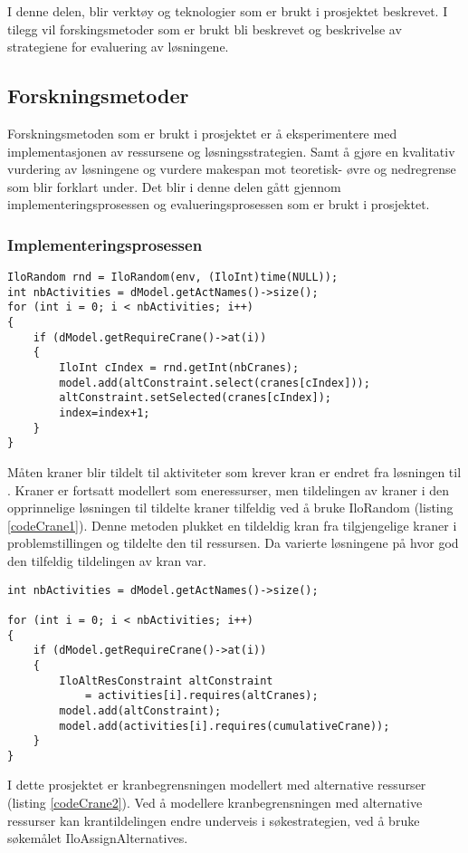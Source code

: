 I denne delen, blir verktøy og teknologier som er brukt i prosjektet beskrevet. I tilegg vil forskingsmetoder som er brukt bli beskrevet og beskrivelse av strategiene for evaluering av løsningene.

\subsection{Forskningsmetoder}
Forskningsmetoden som er brukt i prosjektet er å eksperimentere med implementasjonen av ressursene og løsningsstrategien. Samt å gjøre en kvalitativ vurdering av løsningene og vurdere makespan mot teoretisk- øvre og nedregrense som blir forklart under. Det blir i denne delen gått gjennom implementeringsprosessen og evalueringsprosessen som er brukt i prosjektet.

\subsubsection{Implementeringsprosessen}
\label{sec:implprocess}
\begin{lstlisting}[caption=Opprinnelig kranfordeling, label=codeCrane1]
IloRandom rnd = IloRandom(env, (IloInt)time(NULL));
int nbActivities = dModel.getActNames()->size();
for (int i = 0; i < nbActivities; i++)
{
	if (dModel.getRequireCrane()->at(i))
	{
		IloInt cIndex = rnd.getInt(nbCranes);
		model.add(altConstraint.select(cranes[cIndex]));
		altConstraint.setSelected(cranes[cIndex]);
		index=index+1;
	}
}
\end{lstlisting}
Måten kraner blir tildelt til aktiviteter som krever kran er endret fra løsningen til \bht. Kraner er fortsatt modellert som eneressurser, men tildelingen av kraner i den opprinnelige løsningen til \bht tildelte kraner tilfeldig ved å bruke IloRandom (listing \ref{codeCrane1}). Denne metoden plukket en tildeldig kran fra tilgjengelige kraner i problemstillingen og tildelte den til ressursen. Da varierte løsningene på hvor god den tilfeldig tildelingen av kran var.
\begin{lstlisting}[caption=Endret kranfordeling, label=codeCrane2]
int nbActivities = dModel.getActNames()->size();

for (int i = 0; i < nbActivities; i++)
{
	if (dModel.getRequireCrane()->at(i))
	{
		IloAltResConstraint altConstraint 
			= activities[i].requires(altCranes);
		model.add(altConstraint);
		model.add(activities[i].requires(cumulativeCrane));
	}
}
\end{lstlisting}
I dette prosjektet er kranbegrensningen modellert med alternative ressurser (listing \ref{codeCrane2}). Ved å modellere kranbegrensningen med alternative ressurser kan krantildelingen endre underveis i søkestrategien, ved å bruke søkemålet IloAssignAlternatives.


